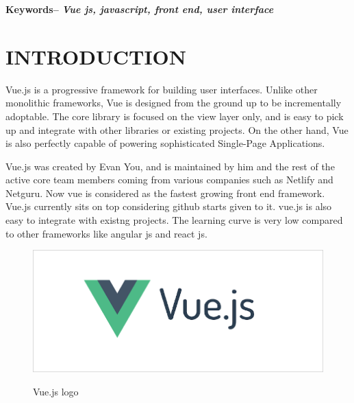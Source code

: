 \documentclass[12pt,a4paper,oneside]{report}
\renewcommand{\footrulewidth}{1.2pt}
\renewcommand{\headrulewidth}{1.2pt}
\begin{document}
\hspace{-.43in} 
\textbf{Keywords--} \textit{\textbf{Vue js, javascript, front end, user interface}}

\tableofcontents
\listoffigures



\newpage
\pagestyle{fancy}
\headheight 26pt
\renewcommand{\footrulewidth}{1.2pt}
\renewcommand{\headrulewidth}{1.2pt}
\rhead{\scriptsize {\leftmark}}
\rfoot{\thepage}
\cfoot{\empty}
\chapter{INTRODUCTION}
\label{intro}

\par
Vue.js  is a progressive framework
for building user interfaces. Unlike other monolithic frameworks,
Vue is designed from the ground up to be incrementally adoptable.
The core library is focused on the view layer only, and is easy to
pick up and integrate with other libraries or existing projects. On
the other hand, Vue is also perfectly capable of powering
sophisticated Single-Page Applications.
\par
 Vue.js was created by Evan You, and is maintained by him and the rest of the active core team members coming from various companies such as Netlify and Netguru. Now vue is considered as the fastest growing front end framework. Vue.js currently sits on top considering github starts given to it. vue.js is also easy to integrate with existng projects. The learning curve is very low compared to other frameworks like angular js and react js.
\par


\begin{figure}[H]
    \begin{center}
        \label{abc}
            \includegraphics[scale=.4]{vue-logo.png}
            \caption{ Vue.js logo\cite{vueLogo}}
    \end{center}
\end{figure}
\end{document}
